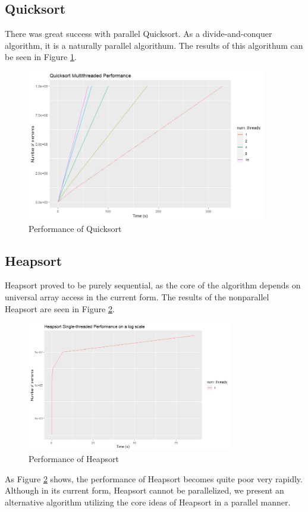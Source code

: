 \documentclass[conference]{IEEEtran}
\begin{document}
\subsection{Quicksort}
There was great success with parallel Quicksort. 
As a divide-and-conquer algorithm, it is a naturally parallel algorithum. 
The results of this algorithum can be seen in Figure \ref{qck_per}. 
\begin{figure}[h]
	\includegraphics[width=10.5cm]{qs_mt.png} 
	\caption{Performance of Quicksort}
	\label{qck_per}
\end{figure}


\subsection{Heapsort}
Heapsort proved to be purely sequential, as the core of the algorithm depends on universal array access in the current form. 
The results of the nonparallel Heapsort are seen in Figure \ref{hs_per}. 
\begin{figure}[h]
	\includegraphics[width=9cm]{hs_per.png} 
	\caption{Performance of Heapsort}
	\label{hs_per}
\end{figure}
As Figure \ref{hs_per} shows, the performance of Heapsort becomes quite poor very rapidly. 
Although in its current form, Heapsort cannot be parallelized, we present an alternative algorithm utilizing the core ideas of Heapsort in a parallel manner. 
\end{document}
